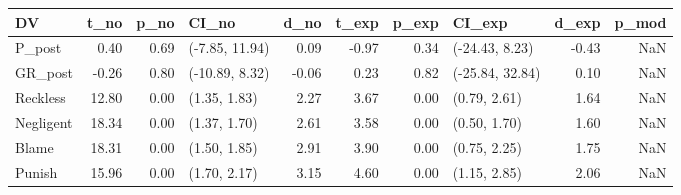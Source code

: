 \begin{tabular}{lrrlrrrlrr}
\toprule
DV & t_no & p_no & CI_no & d_no & t_exp & p_exp & CI_exp & d_exp & p_mod \\
\midrule
P_post & 0.40 & 0.69 & (-7.85, 11.94) & 0.09 & -0.97 & 0.34 & (-24.43, 8.23) & -0.43 & NaN \\
GR_post & -0.26 & 0.80 & (-10.89, 8.32) & -0.06 & 0.23 & 0.82 & (-25.84, 32.84) & 0.10 & NaN \\
Reckless & 12.80 & 0.00 & (1.35, 1.83) & 2.27 & 3.67 & 0.00 & (0.79, 2.61) & 1.64 & NaN \\
Negligent & 18.34 & 0.00 & (1.37, 1.70) & 2.61 & 3.58 & 0.00 & (0.50, 1.70) & 1.60 & NaN \\
Blame & 18.31 & 0.00 & (1.50, 1.85) & 2.91 & 3.90 & 0.00 & (0.75, 2.25) & 1.75 & NaN \\
Punish & 15.96 & 0.00 & (1.70, 2.17) & 3.15 & 4.60 & 0.00 & (1.15, 2.85) & 2.06 & NaN \\
\bottomrule
\end{tabular}

